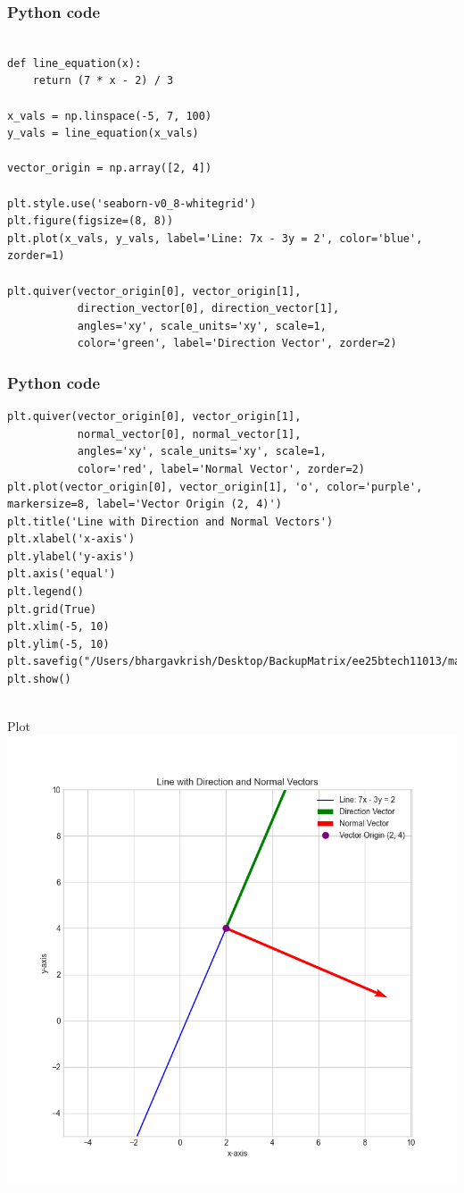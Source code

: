 \documentclass{beamer}
\begin{document}
\begin{frame}[fragile]
    \frametitle{Python code}

    \begin{lstlisting}

def line_equation(x):
    return (7 * x - 2) / 3

x_vals = np.linspace(-5, 7, 100)
y_vals = line_equation(x_vals)

vector_origin = np.array([2, 4])

plt.style.use('seaborn-v0_8-whitegrid')
plt.figure(figsize=(8, 8))
plt.plot(x_vals, y_vals, label='Line: 7x - 3y = 2', color='blue', zorder=1)

plt.quiver(vector_origin[0], vector_origin[1],
           direction_vector[0], direction_vector[1],
           angles='xy', scale_units='xy', scale=1,
           color='green', label='Direction Vector', zorder=2)
    \end{lstlisting}
\end{frame}
\begin{frame}[fragile]
    \frametitle{Python code}

    \begin{lstlisting}
plt.quiver(vector_origin[0], vector_origin[1],
           normal_vector[0], normal_vector[1],
           angles='xy', scale_units='xy', scale=1,
           color='red', label='Normal Vector', zorder=2)
plt.plot(vector_origin[0], vector_origin[1], 'o', color='purple', markersize=8, label='Vector Origin (2, 4)')
plt.title('Line with Direction and Normal Vectors')
plt.xlabel('x-axis')
plt.ylabel('y-axis')
plt.axis('equal')
plt.legend()
plt.grid(True)
plt.xlim(-5, 10)
plt.ylim(-5, 10)
plt.savefig("/Users/bhargavkrish/Desktop/BackupMatrix/ee25btech11013/matgeo/4.2.16/figs/Figure_1.png")
plt.show()


    \end{lstlisting}
\end{frame}

\begin{frame}{Plot}
    \centering
    \includegraphics[width=3\columnwidth, height=0.8\textheight, keepaspectratio]{figs/Figure_1.png}     
\end{frame}
\end{document}
